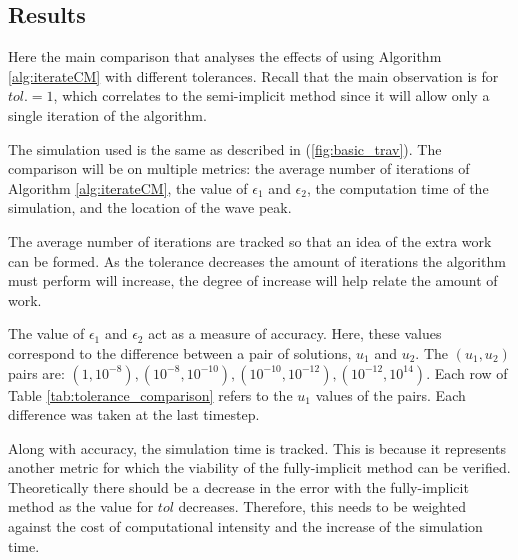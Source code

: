 %
%
%

\subsection{Results}
  Here the main comparison that analyses the effects of using Algorithm \ref{alg:iterateCM} with different tolerances. 
  Recall that the main observation is for $tol. = 1$, which correlates to the semi-implicit method since it will allow only a single iteration of the algorithm. 

  The simulation used is the same as described in (\ref{fig:basic_trav}).
  The comparison will be on multiple metrics: the average number of iterations of Algorithm \ref{alg:iterateCM}, the value of $\epsilon_1$ and $\epsilon_2$, the computation time of the simulation, and the location of the wave peak.

  The average number of iterations are tracked so that an idea of the extra work can be formed.
  As the tolerance decreases the amount of iterations the algorithm must perform will increase, the degree of increase will help relate the amount of work.

  The value of $\epsilon_1$ and $\epsilon_2$ act as a measure of accuracy.
  Here, these values correspond to the difference between a pair of solutions, $u_1$ and $u_2$.
  The $(u_1, u_2)$ pairs are: $(1, 10^{-8}), (10^{-8}, 10^{-10}), (10^{-10}, 10^{-12}), (10^{-12}, 10^{14})$.
  Each row of Table \ref{tab:tolerance_comparison} refers to the $u_1$ values of the pairs.
  Each difference was taken at the last timestep.

  Along with accuracy, the simulation time is tracked.
  This is because it represents another metric for which the viability of the fully-implicit method can be verified.
  Theoretically there should be a decrease in the error with the fully-implicit method as the value for $tol$ decreases.
  Therefore, this needs to be weighted against the cost of computational intensity and the increase of the simulation time.

